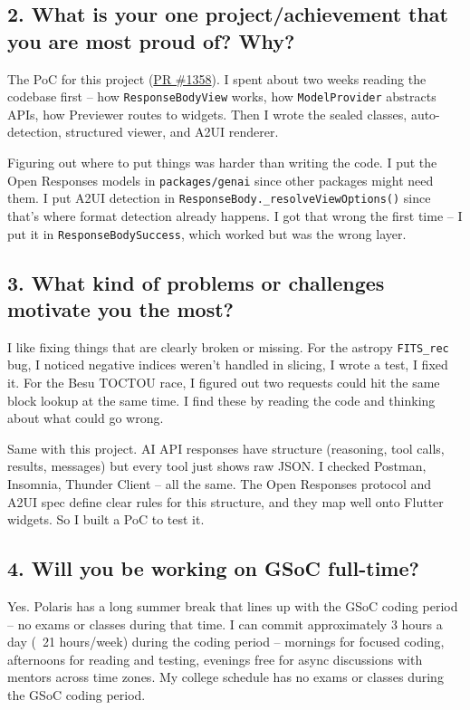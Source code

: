 \documentclass[11pt,a4paper]{article}
\begin{document}
\subsection{2. What is your one project/achievement that you are most proud of? Why?}

The PoC for this project (\href{https://github.com/foss42/apidash/pull/1358}{PR \#1358}). I spent about two weeks reading the codebase first -- how \texttt{ResponseBodyView} works, how \texttt{ModelProvider} abstracts APIs, how Previewer routes to widgets. Then I wrote the sealed classes, auto-detection, structured viewer, and A2UI renderer.

Figuring out where to put things was harder than writing the code. I put the Open Responses models in \texttt{packages/genai} since other packages might need them. I put A2UI detection in \texttt{ResponseBody.\_resolveViewOptions()} since that's where format detection already happens. I got that wrong the first time -- I put it in \texttt{ResponseBodySuccess}, which worked but was the wrong layer.

\subsection{3. What kind of problems or challenges motivate you the most?}

I like fixing things that are clearly broken or missing. For the astropy \texttt{FITS\_rec} bug, I noticed negative indices weren't handled in slicing, I wrote a test, I fixed it. For the Besu TOCTOU race, I figured out two requests could hit the same block lookup at the same time. I find these by reading the code and thinking about what could go wrong.

Same with this project. AI API responses have structure (reasoning, tool calls, results, messages) but every tool just shows raw JSON. I checked Postman, Insomnia, Thunder Client -- all the same. The Open Responses protocol and A2UI spec define clear rules for this structure, and they map well onto Flutter widgets. So I built a PoC to test it.

\subsection{4. Will you be working on GSoC full-time?}

Yes. Polaris has a long summer break that lines up with the GSoC coding period -- no exams or classes during that time. I can commit approximately 3 hours a day (~21 hours/week) during the coding period -- mornings for focused coding, afternoons for reading and testing, evenings free for async discussions with mentors across time zones. My college schedule has no exams or classes during the GSoC coding period.
\end{document}
